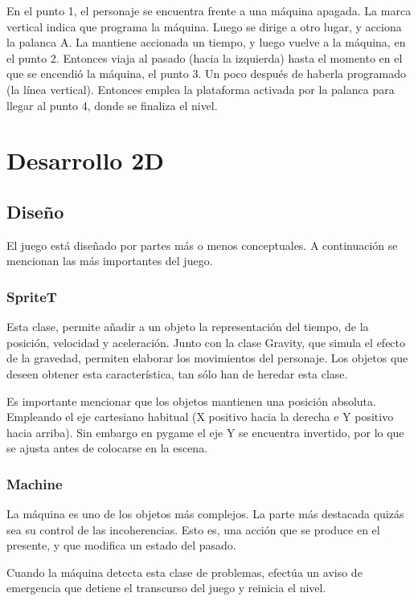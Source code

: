 \documentclass[11pt,a4paper]{article}
\begin{document}
En el punto 1, el personaje se encuentra frente a una máquina apagada. La marca 
vertical indica que programa la máquina. Luego se dirige a otro lugar, y acciona 
la palanca A. La mantiene accionada un tiempo, y luego vuelve a la máquina, en 
el punto 2. Entonces viaja al pasado (hacia la izquierda) hasta el momento en el 
que se encendió la máquina, el punto 3. Un poco después de haberla programado 
(la línea vertical). Entonces emplea la plataforma activada por la palanca para 
llegar al punto 4, donde se finaliza el nivel.

\section{Desarrollo 2D}
\subsection{Diseño}

El juego está diseñado por partes más o menos conceptuales.  A continuación se 
mencionan las más importantes del juego.

\subsubsection{SpriteT}

Esta clase, permite añadir a un objeto la representación del tiempo, de la 
posición, velocidad y aceleración. Junto con la clase Gravity, que simula el 
efecto de la gravedad, permiten elaborar los movimientos del personaje. Los 
objetos que deseen obtener esta característica, tan sólo han de heredar esta 
clase.

Es importante mencionar que los objetos mantienen una posición absoluta.  
Empleando el eje cartesiano habitual (X positivo hacia la derecha e Y positivo 
hacia arriba). Sin embargo en pygame el eje Y se encuentra invertido, por lo que 
se ajusta antes de colocarse en la escena.

\subsubsection{Machine}

La máquina es uno de los objetos más complejos. La parte más destacada quizás 
sea su control de las incoherencias. Esto es, una acción que se produce en el 
presente, y que modifica un estado del pasado.

Cuando la máquina detecta esta clase de problemas, efectúa un aviso de 
emergencia que detiene el transcurso del juego y reinicia el nivel.
\end{document}
